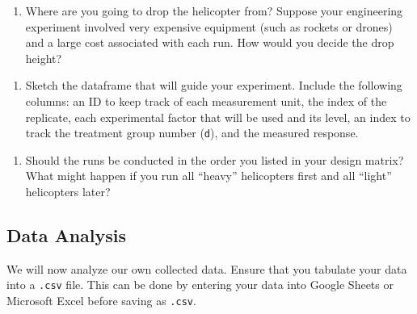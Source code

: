 \documentclass[
  letterpaper,
  DIV=11,
  numbers=noendperiod]{scrartcl}
\providecommand{\tightlist}{%
  \setlength{\itemsep}{0pt}\setlength{\parskip}{0pt}}
\begin{document}
\hfill\break
\hfill\break
\hfill\break
\hfill\break
\hfill\break
\hfill\break
\hfill\break
\hfill\break

\begin{enumerate}
\def\labelenumi{\arabic{enumi}.}
\setcounter{enumi}{5}
\tightlist
\item
  Where are you going to drop the helicopter from? Suppose your
  engineering experiment involved very expensive equipment (such as
  rockets or drones) and a large cost associated with each run. How
  would you decide the drop height?
\end{enumerate}

\hfill\break
\hfill\break
\hfill\break
\hfill\break
\hfill\break
\hfill\break
\hfill\break
\hfill\break

\begin{enumerate}
\def\labelenumi{\arabic{enumi}.}
\setcounter{enumi}{6}
\tightlist
\item
  Sketch the dataframe that will guide your experiment. Include the
  following columns: an ID to keep track of each measurement unit, the
  index of the replicate, each experimental factor that will be used and
  its level, an index to track the treatment group number (\texttt{d}),
  and the measured response.
\end{enumerate}

\hfill\break
\hfill\break
\hfill\break
\hfill\break
\hfill\break
\hfill\break
\hfill\break
\hfill\break
\hfill\break
\hfill\break
\hfill\break
\hfill\break
\hfill\break
\hfill\break
\hfill\break
\hfill\break
\hfill\break
\hfill\break
\hfill\break
\hfill\break
\hfill\break
\hfill\break
\hfill\break
\hfill\break

\begin{enumerate}
\def\labelenumi{\arabic{enumi}.}
\setcounter{enumi}{7}
\tightlist
\item
  Should the runs be conducted in the order you listed in your design
  matrix? What might happen if you run all ``heavy'' helicopters first
  and all ``light'' helicopters later?
\end{enumerate}

\hfill\break
\hfill\break
\hfill\break
\hfill\break
\hfill\break
\hfill\break
\hfill\break
\hfill\break

\subsection{Data Analysis}\label{data-analysis}

We will now analyze our own collected data. Ensure that you tabulate
your data into a \texttt{.csv} file. This can be done by entering your
data into Google Sheets or Microsoft Excel before saving as
\texttt{.csv}.
\end{document}
